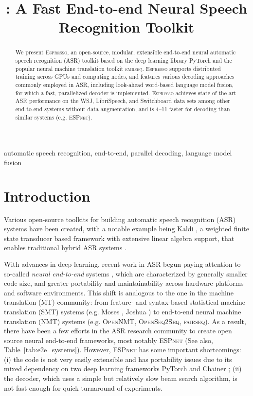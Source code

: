 \documentclass{article}
\title{\espresso: A Fast End-to-end Neural Speech Recognition Toolkit}
\def\espresso{\textsc{Espresso}\xspace}
\def\fairseq{\textsc{fairseq}\xspace}
\def\opennmt{\textsc{OpenNMT}\xspace}
\def\openseqseq{\textsc{OpenSeq2Seq}\xspace}
\def\espnet{\textsc{ESPnet}\xspace}
\begin{document}
\ninept

\maketitle
\begin{abstract}
  We present \espresso, an open-source, modular, extensible end-to-end neural automatic speech recognition (ASR) toolkit based on the deep learning library PyTorch and the popular neural machine translation toolkit \fairseq. \espresso supports distributed training across GPUs and computing nodes, and features various decoding approaches commonly employed in ASR, including look-ahead word-based language model fusion, for which a fast, parallelized decoder is implemented. \espresso achieves state-of-the-art ASR performance on the WSJ, LibriSpeech, and Switchboard data sets among other end-to-end systems without data augmentation, and is 4--11 faster for decoding than similar systems (e.g. \espnet).
\end{abstract}

\begin{keywords}
automatic speech recognition, end-to-end, parallel decoding, language model fusion
\end{keywords}

\section{Introduction}
\label{sec:intro}
Various open-source toolkits for building automatic speech recognition (ASR) systems have been created, with a notable example being Kaldi \cite{povey2011kaldi}, a weighted finite state transducer based framework with extensive linear algebra support, that enables traditional hybrid ASR systems \cite{yu2014automatic}.

With advances in deep learning, recent work in ASR begun paying attention to so-called \emph{neural end-to-end} systems \cite[\emph{inter alia}]{graves2014towards,chorowski2014end,chan2016listen}, which are characterized by generally smaller code size, and greater portability and maintainability across hardware platforms and software environments. This shift is analogous to the one in the machine translation (MT) community: from feature- and syntax-based statistical machine translation (SMT) systems (e.g. Moses \cite{koehn2007moses}, Joshua \cite{li2009joshua}) to end-to-end neural machine translation (NMT) systems (e.g. \opennmt \cite{klein2017opennmt}, \openseqseq \cite{openseq2seq}, \fairseq \cite{ott2019fairseq}). As a result, there have been a few efforts in the ASR research community to create open source neural end-to-end  frameworks, most notably \espnet \cite{watanabe2018espnet} (See also, Table~\ref{tab:e2e_systems}). However, \espnet has some important shortcomings: (i) the code is not very easily extensible and has portability issues due to its mixed dependency on two deep learning frameworks PyTorch \cite{paszke2017automatic} and Chainer \cite{seiya2015chainer}; (ii) the decoder, which uses a simple but relatively slow beam search algorithm, is not fast enough for quick turnaround of experiments.
\end{document}

